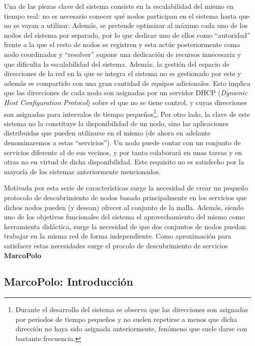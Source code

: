 Una de las piezas clave del sistema consiste en la escalabilidad del mismo en tiempo real: no es necesario conocer qué nodos participan en el sistema hasta que no se vayan a utilizar. Además, se pretende optimizar al máximo cada uno de los nodos del sistema por separado, por lo que dedicar uno de ellos como ``autoridad'' frente a la que el resto de nodos se registren y esta actúe posteriormente como nodo coordinador y ``resolver'' supone una dedicación de recursos innecesaria y que dificulta la escalabilidad del sistema. Además, la gestión del espacio de direcciones de la red en la que se integra el sistema no es gestionado por este y además es compartido con una gran cantidad de equipos adicionales. Esto implica que las direcciones de cada nodo son asignadas por un servidor DHCP (\textit{Dynamic Host Configuration Protocol}) sobre el que no se tiene control, y cuyas direcciones son asignadas para intervalos de tiempo pequeños\footnote{Durante el desarrollo del sistema se observa que las direcciones son asignadas por periodos de tiempo pequeños y no suelen repetirse a menos que dicha dirección no haya sido asignada anteriormente, fenómeno que suele darse con bastante frecuencia.}. %
Por otro lado, la clave de este sistema no la constituye la disponibilidad de un nodo, sino las aplicaciones distribuidas que pueden utilizarse en el mismo (de ahora en adelante denominaremos a estas ``servicios''). Un nodo puede contar con un conjunto de servicios diferente al de sus vecinos, y por tanto colaborará en unas tareas y en otras no en virtud de dicha disponibilidad. Este requisito no es satisfecho por la mayoría de los sistemas anteriormente mencionados.

Motivada por esta serie de características surge la necesidad de crear un pequeño protocolo de descubrimiento de nodos basado principalmente en los servicios que dichos nodos pueden (y desean) ofrecer al conjunto de la malla. Además, siendo uno de los objetivos funcionales del sistema el aprovechamiento del mismo como herramienta didáctica, surge la necesidad de que dos conjuntos de nodos puedan trabajar en la misma red de forma independiente. Como aproximación para satisfacer estas necesidades surge el procolo de descubrimiento de servicios \textbf{MarcoPolo}

\subsection{MarcoPolo: Introducción}

